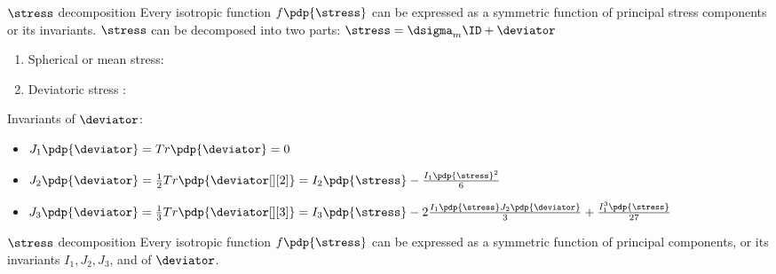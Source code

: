 \begin{frame}{$\stress$ decomposition}
	\vspace{-5mm}
	Every isotropic function $f\pdp{\stress}$ can be expressed as a symmetric function of principal stress components or its invariants. $\stress$ can be decomposed into two parts: $\stress=\dsigma_m\ID+\deviator$
	\begin{enumerate}
		\item Spherical or mean stress:
		\item Deviatoric stress :
	\end{enumerate}
Invariants of $\deviator$:
{\scriptsize
\begin{itemize}
	\item \vspace{-2mm}$J_1\pdp{\deviator}=Tr\pdp{\deviator} = 0$\vspace{-2mm}
	\item $J_2\pdp{\deviator}=\frac{1}{2}Tr\pdp{\deviator[][2]}=I_2\pdp{\stress}-\frac{I_1\pdp{\stress}^2}{6} $
	\item\vspace{-2mm} $J_3\pdp{\deviator}=\frac{1}{3}Tr\pdp{\deviator[][3]}=I_3\pdp{\stress}-2\frac{I_1\pdp{\stress}J_2\pdp{\deviator}}{3}+\frac{I_1^3\pdp{\stress}}{27}$
\end{itemize}
}
\end{frame}


\begin{frame}{$\stress$ decomposition}
 	Every isotropic function $f\pdp{\stress}$ can be expressed as a symmetric function of \stress principal components, or its invariants $I_1,J_2,J_3$, and of $\deviator$.
\end{frame}

